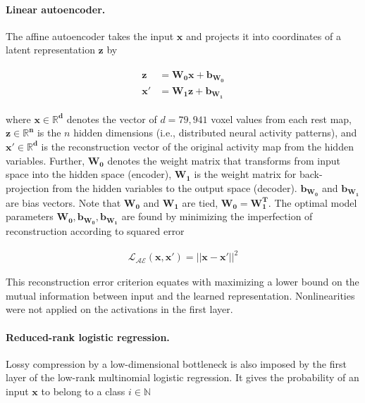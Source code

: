 \documentclass{article} %
\begin{document}
\paragraph{Linear autoencoder.}
The affine autoencoder takes the input 
$\mathbf{x}$ and projects it into coordinates of a
latent representation $\mathbf{z}$
by

\begin{eqnarray}
  \begin{split}
    \mathbf{z} &= \mathbf{W_0} \mathbf{x} + \mathbf{b_{W_0}} \\
    \mathbf{x'} &= \mathbf{W_1} \mathbf{z} + \mathbf{b_{W_1}}
  \end{split}
  \label{eq:autoenc}
\end{eqnarray}

where $\mathbf{x \in \mathbb{R}^{d}}$ denotes the vector of $d=79,941$
voxel values from each
rest map,
$\mathbf{z \in \mathbb{R}^{n}}$ is the $n$ hidden dimensions (i.e.,
distributed neural activity patterns), and 
$\mathbf{x' \in \mathbb{R}^{d}}$
is the reconstruction vector of the original activity map
from the hidden variables. 
Further, $\mathbf{W_0}$ denotes the weight matrix that
transforms
from input space into the hidden space (encoder),
$\mathbf{W_1}$ is the weight matrix for back-projection
from the hidden variables to the
output space (decoder).
$\mathbf{b_{W_0}}$ and $\mathbf{b_{W_1}}$ are bias vectors.
Note that $\mathbf{W_0}$ and $\mathbf{W_1}$ are tied,
$\mathbf{W_0} = \mathbf{W_1^T}$.
The optimal model parameters $\mathbf{W_0, b_{W_0}, b_{W_1}}$ are found by
minimizing the imperfection of reconstruction according to squared error

\begin{eqnarray}
  {\mathcal{L_{AE}}}(\mathbf{x}, \mathbf{x'}) = || \mathbf{x} - \mathbf{x'} ||^2
\end{eqnarray}

This reconstruction error criterion equates with
maximizing a lower bound on the mutual information between
input and the learned representation.
Nonlinearities were not applied on the
activations in the first layer.

\paragraph{Reduced-rank logistic regression.}
Lossy compression by a low-dimensional bottleneck
is also imposed by the first layer of the low-rank
multinomial logistic regression.
It gives the probability of an input $\mathbf{x}$ to belong
to a class $i \in \mathbb{N}$
\end{document}

